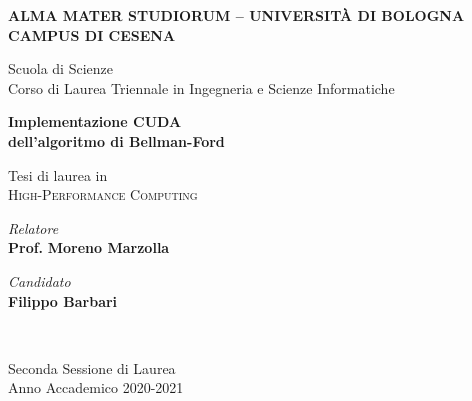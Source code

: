 \documentclass[12pt,a4paper]{book}
\begin{document}
	
	\begin{titlepage}
		\begin{center}
			\large
			\textbf{ALMA MATER STUDIORUM -- UNIVERSITÀ DI BOLOGNA \\ CAMPUS DI CESENA} \\
			\noindent\hrulefill
			\vspace{0.4cm}
			
			\Large
			Scuola di Scienze \\
			Corso di Laurea Triennale in Ingegneria e Scienze Informatiche
			
			\Huge
			\vspace{4cm}
			\textbf{
				Implementazione CUDA \\
				dell'algoritmo di Bellman-Ford
			}
			
			\large
			\vspace{1cm}
			Tesi di laurea in \\
			\textsc{High-Performance Computing}
			
			\vspace{5.5cm}
			\begin{minipage}[t]{0.64\textwidth}
				\begin{flushleft}
					\textit{Relatore} \\ 
					\textbf{Prof.} \textbf{Moreno Marzolla}
				\end{flushleft}
			\end{minipage}
			\begin{minipage}[t]{0.34\textwidth}
				\begin{flushright}
					\textit{Candidato} \\ 
					\textbf{Filippo Barbari}
				\end{flushright}
			\end{minipage}\\
			\vfill
			\noindent\hrulefill
			\vspace{0.3cm}
			
			\Large
			Seconda Sessione di Laurea \\
			Anno Accademico 2020-2021
		\end{center}
	\end{titlepage}
	\restoregeometry
	\newpage
	
	\tableofcontents
	\newpage
	
	\listoffigures
	\newpage
	
	\listoftables
	\newpage
	
	\listofalgorithms
	\newpage
	
\end{document}
